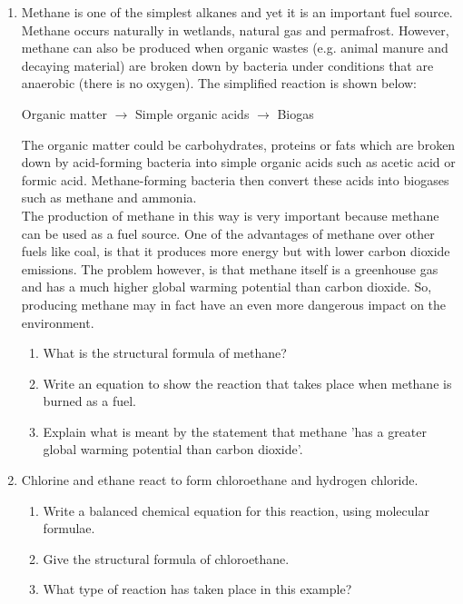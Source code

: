 {\begin{enumerate}
\item{Methane is one of the simplest alkanes and yet it is an important fuel source. Methane occurs naturally in wetlands, natural gas and permafrost. However, methane can also be produced when organic wastes (e.g. animal manure and decaying material) are broken down by bacteria under conditions that are anaerobic (there is no oxygen). The simplified reaction is shown below:

\begin{center}
Organic matter ${\rightarrow}$ Simple organic acids ${\rightarrow}$ Biogas
\end{center}

The organic matter could be carbohydrates, proteins or fats which are broken down by acid-forming bacteria into simple organic acids such as acetic acid or formic acid. Methane-forming bacteria then convert these acids into biogases such as methane and ammonia.\\

The production of methane in this way is very important because methane can be used as a fuel source. One of the advantages of methane over other fuels like coal, is that it produces more energy but with lower carbon dioxide emissions. The problem however, is that methane itself is a greenhouse gas and has a much higher global warming potential than carbon dioxide. So, producing methane may in fact have an even more dangerous impact on the environment.

\begin{enumerate}
\item{What is the structural formula of methane?}
\item{Write an equation to show the reaction that takes place when methane is burned as a fuel.}
\item{Explain what is meant by the statement that methane 'has a greater global warming potential than carbon dioxide'.}
\end{enumerate}
}

\item{Chlorine and ethane react to form chloroethane and hydrogen chloride.}
	\begin{enumerate}
	\item{Write a balanced chemical equation for this reaction, using molecular formulae.}
	\item{Give the structural formula of chloroethane.}
	\item{What type of reaction has taken place in this example?}
	\end{enumerate}


\end{enumerate}}
